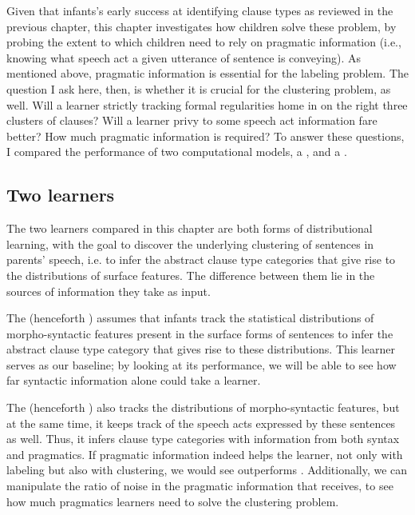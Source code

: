 Given that infants's early success at identifying clause types as reviewed in the previous chapter, this chapter investigates how children solve these problem, by probing the extent to which children need to rely on pragmatic information (i.e., knowing what speech act a given utterance of sentence is conveying). As mentioned above, pragmatic information is essential for the labeling problem. The question I ask here, then, is whether it is crucial for the clustering problem, as well. Will a learner strictly tracking formal regularities home in on the right three clusters of clauses? Will a learner privy to some speech act information fare better? How much pragmatic information is required? To answer these questions, I compared the performance of two computational models, a \text{\distlearner}, and a \text{\praglearner}.

\subsection{Two learners} 
\label{sec:engcl:bg:learners}

The two learners compared in this chapter are both forms of distributional learning, with the goal to discover the underlying clustering of sentences in parents' speech, i.e. to infer the abstract clause type categories that give rise to the distributions of surface features. The difference between them lie in the sources of information they take as input. 

The \tbf{\distlearner{}} (henceforth \dlearnerabbr{}) assumes that infants track the statistical distributions of morpho-syntactic features present in the surface forms of sentences to infer the abstract clause type category that gives rise to these distributions. This learner serves as our baseline; by looking at its performance, we will be able to see how far syntactic information alone could take a learner. 

The \tbf{\praglearner{}} (henceforth \plearnerabbr{}) also tracks the distributions of morpho-syntactic features, but at the same time, it  keeps track of the speech acts expressed by these sentences as well. Thus, it infers clause type categories with information from both syntax and pragmatics. If pragmatic information indeed helps the learner, not only with labeling but also with clustering, we would see \plearnerabbr{} outperforms \dlearnerabbr. Additionally, we can manipulate the ratio of noise in the pragmatic information that \plearnerabbr{} receives, to see how much pragmatics learners need to solve the clustering problem. 




